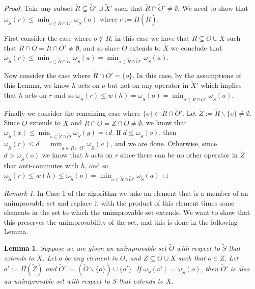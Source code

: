 \documentclass[12pt]{amsbook}
\theoremstyle{plain}
\newtheorem{lemma}{Lemma}
\theoremstyle{definition}
\theoremstyle{remark}
\newtheorem{remark}{Remark}
\newcommand{\set}{\tilde}
\newcommand{\om}{\omega}
\newcommand{\paren}[1]{\left(#1\right)}
\begin{document}
\begin{proof}
Take any subset $\set R\subseteq \set O'\cup\set X'$ such that $\set R\cap\set O'\ne\emptyset$.  We need to show that $\om_{\set S}\paren{r} \le \min_{a\in\set R\cap\set O'}\om_{\set S}(a)$ where $r:=\Pi(\set R)$.

First consider the case where $o\notin \set R$;  in this case we have that $\set R\subseteq \set O\cup\set X$ such that $\set R\cap\set O=\set R\cap\set O'\ne\emptyset$, and so since $\set O$ extends to $\set X$ we conclude that $\om_{\set S}\paren{r} \le \min_{a\in\set R\cap\set O}\om_{\set S}(a)= \min_{a\in\set R\cap\set O'}\om_{\set S}(a)$.

Now consider the case where $\set R\cap\set O'=\{o\}$.  In this case, by the assumptions of this Lemma, we know $h$ acts on $o$ but not on any operator in $\set X'$ which implies that $h$ acts on $r$ and so $\om_{\set S}(r) \le w(h)=\om_{\set S}(o)=\min_{a\in\set R\cap\set O'}\om_{\set S}(a)$.

Finally we consider the remaining case where $\{o\}\subset\set R\cap\set O'$. Let $\set Z := \set R\backslash\{o\}\ne\emptyset$.  Since $\set O$ extends to $\set X$ and $\set R\cap\set O=\set Z\cap\set O\ne\emptyset$, we know that $\om_{\set S}(x)\le \min_{a\in\set Z\cap\set O}\om_{\set S}(y)=:d$.  If $d \le \om_{\set S}(o)$, then $\om_{\set S}(r)\le d = \min_{a\in\set R\cap\set O'}\om_{\set S}(a)$, and we are done.  Otherwise, since $d> \om_{\set S}(o)$ we know that $h$ acts on $r$ since there can be no other operator in $\set Z$ that anti-commutes with $h$, and so $\om_{\set S}(r) \le w(h)\le\om_{\set S}(o)=\min_{a\in\set R\cap\set O'}\om_{\set S}(a)$
\end{proof}
\begin{remark}
In Case 1 of the algorithm we take an element that is a member of an unimprovable set and replace it with the product of this element times some elements in the set to which the unimprovable set extends.  We want to show that this preserves the unimprovability of the set, and this is done in the following Lemma.
\end{remark}

\begin{lemma}
\label{lemma:replacing element with product preserves unimprovability}
Suppose we are given an unimprovable set $\set O$ with respect to $\set S$ that extends to $\set X$.  Let $o$ be any element in $\set O$, and $\set Z\subseteq \set O\cup\set X$ such that $o\in \set Z$.  Let $o':=\Pi(\set Z)$ and $\set O' := \paren{\set O\backslash\{o\}}\cup\{o'\}$.  If $\om_{\set S}(o')=\om_{\set S}(o)$, then $\set O'$ is also an unimprovable set with respect to $\set S$ that extends to $\set X$.
\end{lemma}
\end{document}
